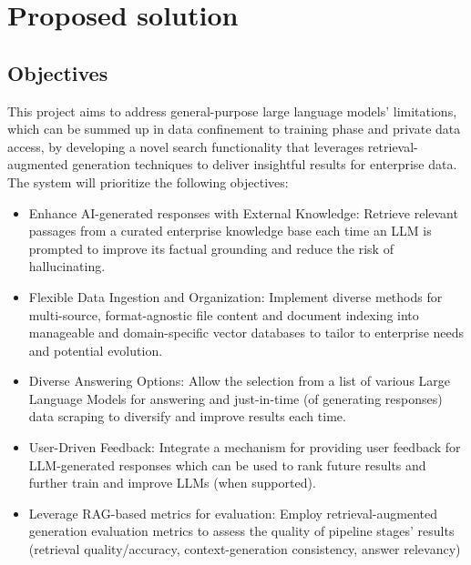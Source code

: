 \section{Proposed solution}
\subsection{Objectives}
This project aims to address general-purpose large language models' limitations, which can be summed up in data confinement to training phase and private data access, by developing a novel search functionality that leverages retrieval-augmented generation techniques to deliver insightful results for enterprise data. The system will prioritize the following objectives:
\begin{itemize}
    \item Enhance AI-generated responses with External Knowledge: Retrieve relevant passages from a curated enterprise knowledge base each time an LLM is prompted to improve its factual grounding and reduce the risk of hallucinating.
    \item Flexible Data Ingestion and Organization: Implement diverse methods for multi-source, format-agnostic file content and document indexing into manageable and domain-specific vector databases to tailor to enterprise needs and potential evolution.
    \item Diverse Answering Options: Allow the selection from a list of various Large Language Models for answering and just-in-time (of generating responses) data scraping to diversify and improve results each time.
    \item User-Driven Feedback: Integrate a mechanism for providing user feedback for LLM-generated responses which can be used to rank future results and further train and improve LLMs (when supported).
    \item Leverage RAG-based metrics for evaluation: Employ retrieval-augmented generation evaluation metrics to assess the quality of pipeline stages' results (retrieval quality/accuracy, context-generation consistency, answer relevancy)
\end{itemize}
\newpage
